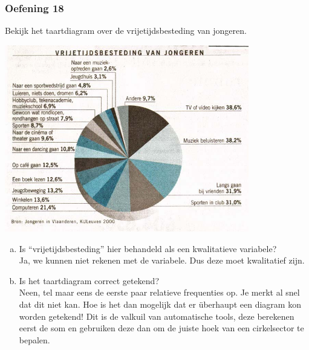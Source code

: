 \documentclass[13pt]{beamer}
\newenvironment{answer}
{\color{blue}}
{\color{black}}
\begin{document}
\begin{frame}
  \frametitle{Oefening 18}
  \begin{minipage}{0.35\linewidth}
    Bekijk het taartdiagram over de vrijetijdsbesteding van jongeren.
  \end{minipage}
  \begin{minipage}{0.6\linewidth}
    \vspace*{-1cm}
    \begin{center}
      \includegraphics[width=0.8\textwidth]{cirkeldiagram-vrijetijdsbesteding}
    \end{center}
  \end{minipage}
  \begin{enumerate}[(a)]
  \item Is “vrijetijdsbesteding” hier behandeld als een kwalitatieve variabele?\\
    \begin{answer}
      Ja, we kunnen niet rekenen met de variabele. Dus deze moet kwalitatief zijn.
    \end{answer}
  \item Is het taartdiagram correct getekend?\\
    \begin{answer}
      Neen, tel maar eens de eerste paar relatieve frequenties op. Je merkt al snel dat dit niet kan. Hoe is het dan mogelijk dat er überhaupt een diagram kon worden getekend! Dit is de valkuil van automatische tools, deze berekenen eerst de som en gebruiken deze dan om de juiste hoek van een cirkelsector te bepalen.
    \end{answer}
  \end{enumerate}
\end{frame}
\end{document}
